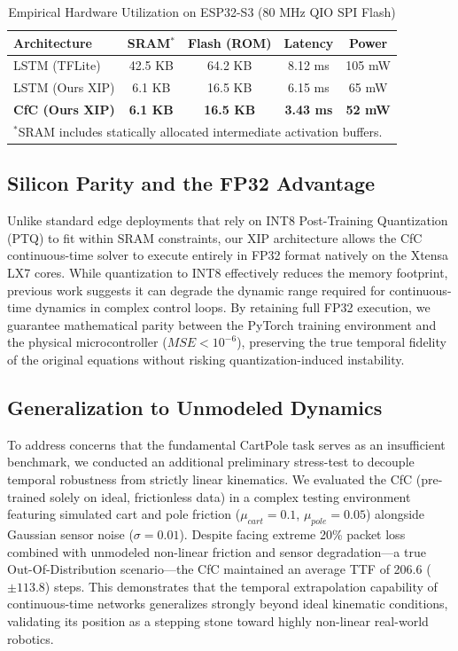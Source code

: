 \documentclass[conference]{IEEEtran}
\begin{document}
\begin{table}[h]
\centering
\caption{Empirical Hardware Utilization on ESP32-S3 (80 MHz QIO SPI Flash)}
\label{tab:hardware}
\begin{tabular}{|l|c|c|c|c|}
\hline
\textbf{Architecture} & \textbf{SRAM$^*$} & \textbf{Flash (ROM)} & \textbf{Latency} & \textbf{Power} \\ \hline
LSTM (TFLite) & 42.5 KB       & 64.2 KB              & 8.12 ms          & 105 mW         \\ \hline
LSTM (Ours XIP) & 6.1 KB       & 16.5 KB              & 6.15 ms          & 65 mW          \\ \hline
\textbf{CfC (Ours XIP)} & \textbf{6.1 KB} & \textbf{16.5 KB} & \textbf{3.43 ms} & \textbf{52 mW} \\ \hline
\multicolumn{5}{l}{\footnotesize $^*$SRAM includes statically allocated intermediate activation buffers.} \\
\end{tabular}
\end{table}

\subsection{Silicon Parity and the FP32 Advantage}
Unlike standard edge deployments that rely on INT8 Post-Training Quantization (PTQ) to fit within SRAM constraints, our XIP architecture allows the CfC continuous-time solver to execute entirely in FP32 format natively on the Xtensa LX7 cores. While quantization to INT8 effectively reduces the memory footprint, previous work suggests it can degrade the dynamic range required for continuous-time dynamics in complex control loops. By retaining full FP32 execution, we guarantee mathematical parity between the PyTorch training environment and the physical microcontroller ($MSE < 10^{-6}$), preserving the true temporal fidelity of the original equations without risking quantization-induced instability.

\subsection{Generalization to Unmodeled Dynamics}
\label{sec:generalization}
To address concerns that the fundamental CartPole task serves as an insufficient benchmark, we conducted an additional preliminary stress-test to decouple temporal robustness from strictly linear kinematics. We evaluated the CfC (pre-trained solely on ideal, frictionless data) in a complex testing environment featuring simulated cart and pole friction ($\mu_{cart}=0.1$, $\mu_{pole}=0.05$) alongside Gaussian sensor noise ($\sigma=0.01$). Despite facing extreme 20\% packet loss combined with unmodeled non-linear friction and sensor degradation—a true Out-Of-Distribution scenario—the CfC maintained an average TTF of 206.6 ($\pm 113.8$) steps. This demonstrates that the temporal extrapolation capability of continuous-time networks generalizes strongly beyond ideal kinematic conditions, validating its position as a stepping stone toward highly non-linear real-world robotics.
\end{document}
